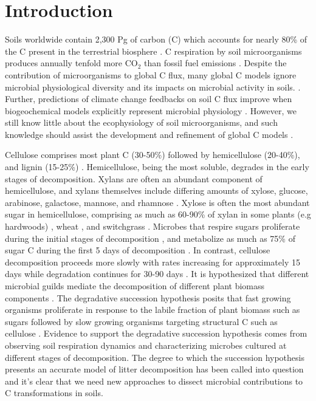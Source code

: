 \section{Introduction}
Soils worldwide contain 2,300 Pg of carbon (C) which accounts for nearly 80\%
of the C present in the terrestrial biosphere
\citep{Amundson_2001,BATJES_1996}. C respiration by soil microorganisms
produces annually tenfold more CO$_{2}$ than fossil fuel emissions
\citep{chapin2002principles}. Despite the contribution of microorganisms to
global C flux, many global C models ignore microbial
physiological diversity and its impacts on microbial activity in soils.
\citep{Allison2010,Six2006,Treseder2011}. Further, predictions of climate
change feedbacks on soil C flux improve when biogeochemical models explicitly
represent microbial physiology \citep{Wieder2013}. However, we still know
little about the ecophysiology of soil microorganisms, and such knowledge
should assist the development and refinement of global C models
\citep{Bradford2008,Neff_2001,McGuire2010}.

Cellulose comprises most plant C (30-50\%) followed by hemicellulose (20-40\%),
and lignin (15-25\%) \citep{Lynd2002}. Hemicellulose, being the most soluble,
degrades in the early stages of decomposition. Xylans are often an abundant
component of hemicellulose, and xylans themselves include differing amounts of
xylose, glucose, arabinose, galactose, mannose, and rhamnose \citep{Saha2003}.
Xylose is often the most abundant sugar in hemicellulose, comprising as much as
60-90\% of xylan in some plants (e.g hardwoods) \citep{Spiridon2008}, wheat
\citep{Sun2005}, and switchgrass \citep{Bunnell2013}. Microbes that respire
sugars proliferate during the initial stages of decomposition
\citep{Garrett1951,Alexander1964}, and metabolize as much as 75\% of sugar
C during the first 5 days of decomposition \citep{Engelking2007}. In contrast,
cellulose decomposition proceeds more slowly with rates increasing for
approximately 15 days while degradation continues for 30-90 days
\citep{Hu1997,Engelking2007}. It is hypothesized that different microbial
guilds mediate the decomposition of different plant biomass components
\citep{Hu1997,Rui2009,AnneliseHKjoller2002,Bastian2009}. The
degradative succession hypothesis posits that fast growing organisms
proliferate in response to the labile fraction of plant biomass such as sugars
\citep{Garrett1963,Bremer1994} followed by slow growing organisms
targeting structural C such as cellulose \citep{Garrett1963}. Evidence to
support the degradative succession hypothesis comes from observing soil
respiration dynamics and characterizing microbes cultured at different stages
of decomposition. The degree to which the succession hypothesis presents an
accurate model of litter decomposition has been called into question
\citep{AnneliseHKjoller2002,Frankland1998,Osono_2005} and it's clear that we
need new approaches to dissect microbial contributions to C transformations in
soils.

